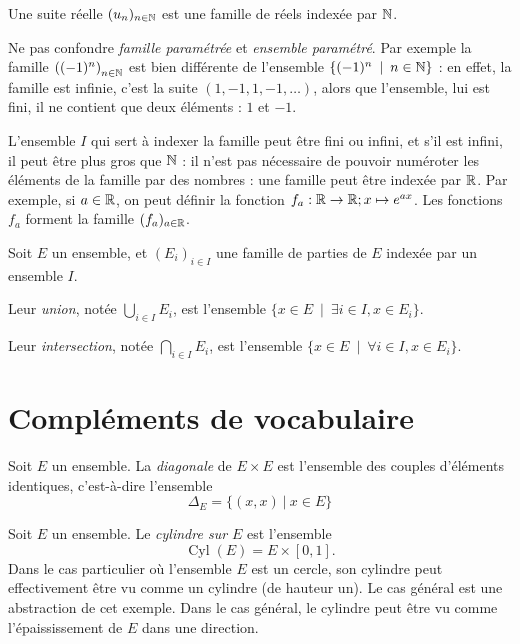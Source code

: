 \begin{exemple}
Une suite réelle $(u_n)_{n\in \mathbb{N}}$ est une famille de réels indexée par $\mathbb{N}$.
\end{exemple}

\begin{attention}
Ne pas confondre \emph{famille paramétrée} et \emph{ensemble paramétré}. Par exemple la famille $\left( (-1)^n \right)_{n\in \mathbb{N}}$ est bien différente de l'ensemble $\left\{(-1)^n\:\mid\:n\in \N\right\}$ : en effet, la famille est infinie, c'est la suite $(1,-1, 1,-1, \dots)$, alors que l'ensemble, lui est fini, il ne contient que deux éléments : $1$ et $-1$.
\end{attention}

L'ensemble $I$ qui sert à indexer la famille peut être fini ou infini, et s'il est infini, il peut être plus gros que $\mathbb{N}$ : il n'est pas nécessaire de pouvoir numéroter les éléments de la famille par des nombres : une famille peut être indexée par $\mathbb{R}$. Par exemple, si $a\in \mathbb{R}$, on peut définir la fonction $f_a : \mathbb{R}\to \mathbb{R}; x\mapsto e^{ax}$. Les fonctions $f_a$ forment la famille $(f_a)_{a\in \mathbb{R}}$.


\begin{definition}
Soit $E$ un ensemble, et $(E_i)_{i\in I}$ une famille de parties de $E$ indexée par un ensemble $I$.

Leur \emph{union}, notée $\bigcup_{i\in I} E_i$, est l'ensemble $\{x\in E\:\mid\: \exists i\in I, x\in E_i\}$.

Leur \emph{intersection}, notée $\bigcap_{i\in I} E_i$, est l'ensemble $\{x\in E\:\mid\: \forall i\in I, x\in E_i\}$.
\end{definition}

\section{Compléments de vocabulaire}

\begin{definition}[Diagonale]
Soit $E$ un ensemble. La \emph{diagonale} de $E\times E$ est l'ensemble des couples d'éléments identiques, c'est-à-dire l'ensemble
\[
\Delta_E = \{(x,x)\:|\: x\in E\}
\]
\end{definition}

\begin{definition}
Soit $E$ un ensemble. Le \emph{cylindre sur $E$} est l'ensemble 
\[ \operatorname{Cyl}(E) = E\times[0,1].\]
Dans le cas particulier où l'ensemble $E$ est un cercle, son cylindre peut effectivement être vu comme un cylindre (de hauteur un). Le cas général est une abstraction de cet exemple. Dans le cas général, le cylindre peut être vu comme \og l'épaississement de $E$ dans une direction\fg.
\end{definition}


